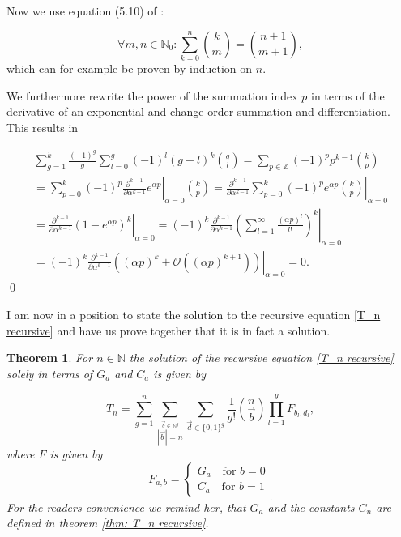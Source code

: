 \documentclass[b5paper,draft,openbib,12pt]{memoir}
\newtheorem{Thm}[Def]{Theorem}
\begin{document}
Now we use equation (5.10) of \cite{graham1994concrete}:

\begin{equation}\tag{upper summation}
\forall m,n\in\mathbb{N}_0: \sum_{k=0}^n \binom{k}{m} = \binom{n+1}{m+1},
\end{equation}
which can for example be proven by induction on \(n\).

We furthermore rewrite the power of the summation index \(p\) in terms of the derivative of an 
exponential and change order summation and differentiation. This results in

\begin{multline*}
\sum_{g=1}^k \frac{(-1)^g}{g} \sum_{l=0}^g (-1)^l (g-l)^k \binom{g}{l}
=\sum_{p\in\mathbb{Z}} (-1)^{p} p^{k-1}  \binom{k}{p}\\
=\sum_{p=0}^k (-1)^{p} \left. \frac{\partial^{k-1}}{\partial \alpha^{k-1}} e^{\alpha p}\right|_{\alpha=0}  \binom{k}{p}
=\left. \frac{\partial^{k-1}}{\partial \alpha^{k-1}}  \sum_{p=0}^k (-1)^{p} e^{\alpha p} \binom{k}{p}\right|_{\alpha=0} \\
=\left. \frac{\partial^{k-1}}{\partial \alpha^{k-1}}  \left( 1-e^{\alpha p}\right)^k \right|_{\alpha=0} 
=(-1)^k \left. \frac{\partial^{k-1}}{\partial \alpha^{k-1}} \left( \sum_{l=1}^\infty \frac{(\alpha p)^l}{l!} \right) ^k \right|_{\alpha=0} \\
=(-1)^k \left. \frac{\partial^{k-1}}{\partial \alpha^{k-1}} ((\alpha p)^k + \mathcal{O} ((\alpha p)^{k+1}) ) \right|_{\alpha=0} =0.
\end{multline*}
\qed




I am now in a position to state the solution to the recursive equation \eqref{T_n recursive}
and have us prove together that it is in fact a solution. 

\begin{Thm}
For \(n\in\mathbb{N}\) the solution of the recursive equation \eqref{T_n recursive} 
solely in terms of \(G_a\) and \(C_a\) is given by

\begin{equation}\label{recursive solution}
T_n = \sum_{g=1}^n \sum_{\stackrel{\vec{b}\in\mathbb{N}^g}{|\vec{b}|= n}} \sum_{\vec{d}\in {\{0,1\}}^g} 
\frac{1}{g!} \binom{n}{\vec{b}} \prod_{l=1}^g F_{b_l,d_l},
\end{equation}
where \(F\) is given by
\begin{equation}\label{eq resursive weak solution}
F_{a,b} = \left\{ \begin{matrix}G_a \quad \text{for } b=0 \\ C_a \quad \text{for } b=1  \end{matrix} \right._. 
\end{equation}
For the readers convenience we remind her, that \(G_a\) and
the constants \(C_n\) are defined in theorem \ref{thm: T_n recursive}. 
\end{Thm}
\end{document}
